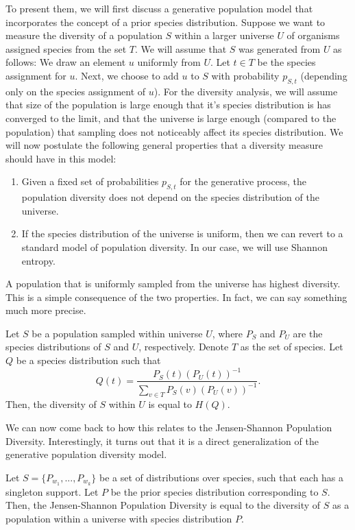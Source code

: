 To present them, we will first
discuss a generative population model that incorporates the concept of
a prior species distribution. Suppose we want to measure the diversity
of a population $S$ within a larger universe $U$ of organisms assigned
species from the set $T$. We will assume that $S$ was generated from
$U$ as follows: We draw an element $u$ uniformly from $U$. Let $t\in
T$ be the species assignment for $u$. Next, we choose to add $u$ to
$S$ with probability $p_{S,t}$ (depending only on the species
assignment of $u$). For the diversity analysis, we will assume that
size of the population is large enough that it's species
distribution is has converged to the limit, and that the universe is
large enough (compared to the population) that sampling does not
noticeably affect its species distribution. We will now postulate
the following general properties that a diversity measure
should have in this model:
\begin{enumerate}
\item Given a fixed set of probabilities $p_{S,t}$ for the generative
  process, the population diversity does not depend on the species
  distribution of the universe.
\item If the species distribution of the universe is uniform, then we can
  revert to a standard model of population diversity. In our case, we
  will use Shannon entropy.
\end{enumerate}

\ber
A population that is uniformly sampled from the universe has
  highest diversity. 
\eer
This is a simple consequence of the two properties. In fact, we can
say something much more precise.

\bep
Let $S$ be a population sampled within universe $U$, where $P_S$ and
$P_U$ are the species distributions of $S$ and $U$,
respectively. Denote $T$ as the set of species. Let $Q$ be a species
distribution such that
\[Q(t)=\frac{P_S(t)(P_U(t))^{-1}}{\sum_{v\in T} P_S(v)(P_U(v))^{-1}}.\]
Then, the diversity of $S$ within $U$ is equal to $H(Q)$.
\eep

We can now come back to how this relates to the Jensen-Shannon
Population Diversity. Interestingly, it turns out that it is a direct
generalization of the generative population diversity model.

\bep
Let $S=\{P_{w_1},...,P_{w_k}\}$ be a set of distributions over species,
such that each has a singleton support. Let $P$ be the prior
species distribution corresponding to $S$. Then, the Jensen-Shannon
Population Diversity is equal to the diversity of $S$ as a population
within a universe with species distribution $P$.
\eep